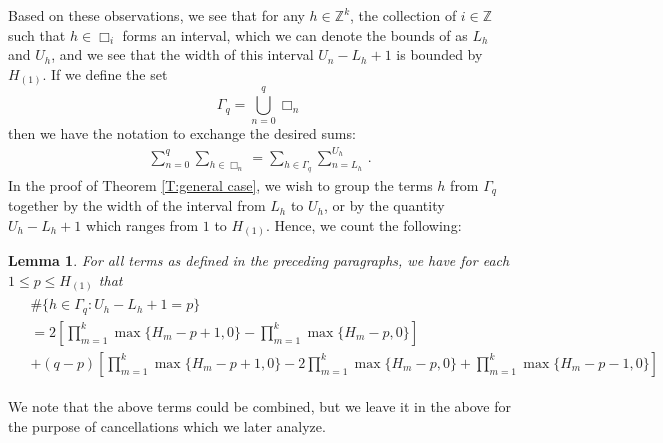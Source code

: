 \documentclass[11pt, oneside]{amsart}   	%
\newcommand{\1}{\mathbbm{1}}
\newtheorem{lemma}[theorem]{Lemma}
\theoremstyle{definition}
\begin{document}
Based on these observations, we see that for any $h\in \mathbb{Z}^k$, the collection of $i\in \mathbb{Z}$ such that $h \in \Box_i$ forms an interval, which we can denote the bounds of as $L_h$ and $U_h$, and we see that the width of this interval $U_n - L_h +1$ is bounded by $H_{(1)}$. If we define the set
$$\Gamma_q = \bigcup_{n=0}^q \Box_n$$
then we have the notation to exchange the desired sums:
\begin{align*}
    \sum_{n=0}^q \sum_{h\in \Box_n} = \sum_{h \in \Gamma_q} \sum_{n= L_h}^{U_h} \, .
\end{align*}
In the proof of Theorem \ref{T:general case}, we wish to group the terms $h$ from $\Gamma_q$ together by the width of the interval from $L_h$ to $U_h$, or by the quantity $U_h - L_h + 1$ which ranges from $1$ to $H_{(1)}$. Hence, we count the following:
\begin{lemma}\label{L:exact count for gamma}
For all terms as defined in the preceding paragraphs, we have for each $1 \leq p \leq H_{(1)}$ that
\begin{align}\label{F:exact count for gamma}
\begin{split}
&\#\{h\in \Gamma_q : U_h - L_h +1 = p\} \\ &= 2 \left[ \prod_{m=1}^k \max\{H_m - p + 1, 0\} - \prod_{m=1}^k \max\{H_m - p, 0\}\right] \\
&+ (q - p) \left[ \prod_{m=1}^k \max\{H_m - p+1, 0\} - 2\prod_{m=1}^k \max\{H_m - p,0 \} + \prod_{m=1}^k \max\{H_m - p - 1, 0\}\right]
\end{split}
\end{align}
\end{lemma}
We note that the above terms could be combined, but we leave it in the above for the purpose of cancellations which we later analyze.
\end{document}
